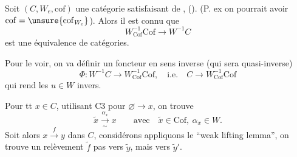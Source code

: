 Soit $(C,W_e,\mathrm{cof})$ une catégorie satisfaisant  de \uline{}, ().
(P. ex on pourrait avoir $\mathrm{cof}=\unsure{\mathrm{cof}_{W_e}}$). Alors il est connu que
\[
W_{\mathrm{Cof}}^{-1}\mathrm{Cof}\longrightarrow W^{-1}C
\]
est une équivalence de catégories.

Pour le voir, on va définir un foncteur en sens inverse (qui sera quasi-inverse)
\[
\Phi:W^{-1}C\longrightarrow W_{\mathrm{Cof}}^{-1}\mathrm{Cof},\quad\text{i.e.}\quad C\longrightarrow W_{\mathrm{Cof}}^{-1}\mathrm{Cof}
\]
qui rend les $u\in W$ invers.

Pour tt $x\in C$, utilisant C3 pour $\varnothing\longrightarrow x$, on trouve
\[
\tilde x\xrightarrow[\sim]{\alpha_x}x\qquad\text{avec}\quad \tilde x\in\mathrm{Cof},\ \alpha_x\in W.
\]
Soit alors $x\xrightarrow{f}y$ dans $C$,
considérons
appliquons le ``weak lifting lemma'', on trouve
un relèvement $\tilde f$    pas vers $\tilde y$, mais vers $\tilde y'$.

